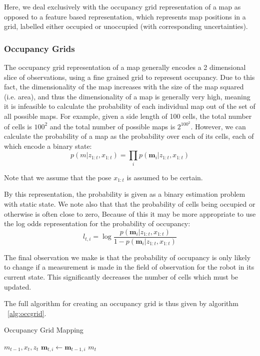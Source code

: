 \documentclass[english]{article}
\begin{document}
Here, we deal exclusively with the occupancy grid representation of a map as opposed to a feature based representation, which represents map positions in a grid, labelled either occupied or unoccupied (with corresponding uncertainties). 

\subsubsection{Occupancy Grids}
The occupancy grid representation of a map generally encodes a 2 dimensional slice of observations, using a fine grained grid to represent occupancy. Due to this fact, the dimensionality of the map increases with the size of the map squared (i.e. area), and thus the dimensionality of a map is generally very high, meaning it is infeasible to calculate the probability of each individual map out of the set of all possible maps. For example, given a side length of 100 cells, the total number of cells is $100^2$ and the total number of possible maps is $2^{100^2}$. However, we can calculate the probability of a map as the probability over each of its cells, each of which encode a binary state:
\begin{equation}
p\left(m | z_{1:t}, x_{1:t}\right) = \prod_i p\left(\textbf{m}_i | z_{1:t}, x_{1:t}\right)
\end{equation}

Note that we assume that the pose $x_{1:t}$ is assumed to be certain. 

By this representation, the probability is given as a binary estimation problem with static state. We note also that that the probability of cells being occupied or otherwise is often close to zero, Because of this it may be more appropriate to use the log odds representation for the probability of occupancy:
\begin{equation}
l_{t,i} = \log{\frac{p(\textbf{m}_i | z_{1:t}, x_{1:t})}{1-p(\textbf{m}_i | z_{1:t}, x_{1:t})}}
\end{equation}

The final observation we make is that the probability of occupancy is only likely to change if a measurement is made in the field of observation for the robot in its current state. This significantly decreases the number of cells which must be updated.

The full algorithm for creating an occupancy grid is thus given by algorithm ~\ref{alg:occgrid}.

\begin{algorithm}
\caption{Occupancy Grid Mapping}
\label{alg:occgrid}
\begin{algorithmic}
	\REQUIRE $m_{t-1}, x_t, z_t$
	\ELSE
	\STATE $\textbf{m}_{t, i} \leftarrow \textbf{m}_{t-1, i}$
	\ENDIF
	\ENDFOR
	\RETURN $m_t$
\end{algorithmic}
\end{algorithm}
\end{document}
